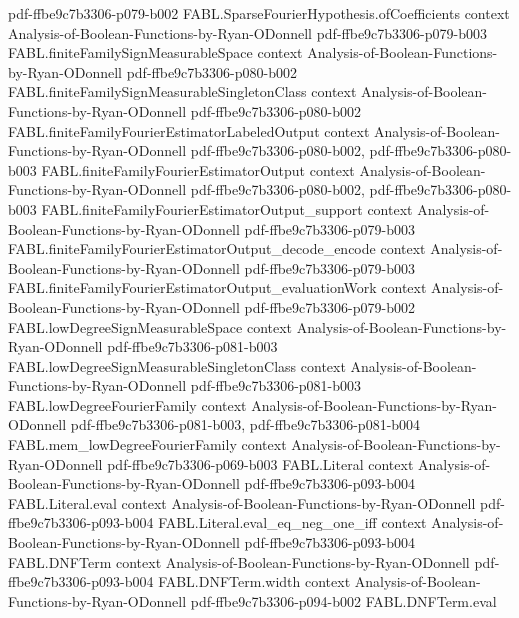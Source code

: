\begin{theorem}
  {pdf-ffbe9c7b3306-p079-b002}
\proofstep
  {FABL.SparseFourierHypothesis.ofCoefficients}
  {context}
  {Analysis-of-Boolean-Functions-by-Ryan-ODonnell}
  {pdf-ffbe9c7b3306-p079-b003}
\proofstep
  {FABL.finiteFamilySignMeasurableSpace}
  {context}
  {Analysis-of-Boolean-Functions-by-Ryan-ODonnell}
  {pdf-ffbe9c7b3306-p080-b002}
\proofstep
  {FABL.finiteFamilySignMeasurableSingletonClass}
  {context}
  {Analysis-of-Boolean-Functions-by-Ryan-ODonnell}
  {pdf-ffbe9c7b3306-p080-b002}
\proofstep
  {FABL.finiteFamilyFourierEstimatorLabeledOutput}
  {context}
  {Analysis-of-Boolean-Functions-by-Ryan-ODonnell}
  {pdf-ffbe9c7b3306-p080-b002,
    pdf-ffbe9c7b3306-p080-b003}
\proofstep
  {FABL.finiteFamilyFourierEstimatorOutput}
  {context}
  {Analysis-of-Boolean-Functions-by-Ryan-ODonnell}
  {pdf-ffbe9c7b3306-p080-b002,
    pdf-ffbe9c7b3306-p080-b003}
\proofstep
  {FABL.finiteFamilyFourierEstimatorOutput_support}
  {context}
  {Analysis-of-Boolean-Functions-by-Ryan-ODonnell}
  {pdf-ffbe9c7b3306-p079-b003}
\proofstep
  {FABL.finiteFamilyFourierEstimatorOutput_decode_encode}
  {context}
  {Analysis-of-Boolean-Functions-by-Ryan-ODonnell}
  {pdf-ffbe9c7b3306-p079-b003}
\proofstep
  {FABL.finiteFamilyFourierEstimatorOutput_evaluationWork}
  {context}
  {Analysis-of-Boolean-Functions-by-Ryan-ODonnell}
  {pdf-ffbe9c7b3306-p079-b002}
\proofstep
  {FABL.lowDegreeSignMeasurableSpace}
  {context}
  {Analysis-of-Boolean-Functions-by-Ryan-ODonnell}
  {pdf-ffbe9c7b3306-p081-b003}
\proofstep
  {FABL.lowDegreeSignMeasurableSingletonClass}
  {context}
  {Analysis-of-Boolean-Functions-by-Ryan-ODonnell}
  {pdf-ffbe9c7b3306-p081-b003}
\proofstep
  {FABL.lowDegreeFourierFamily}
  {context}
  {Analysis-of-Boolean-Functions-by-Ryan-ODonnell}
  {pdf-ffbe9c7b3306-p081-b003,
    pdf-ffbe9c7b3306-p081-b004}
\proofstep
  {FABL.mem_lowDegreeFourierFamily}
  {context}
  {Analysis-of-Boolean-Functions-by-Ryan-ODonnell}
  {pdf-ffbe9c7b3306-p069-b003}
\proofstep
  {FABL.Literal}
  {context}
  {Analysis-of-Boolean-Functions-by-Ryan-ODonnell}
  {pdf-ffbe9c7b3306-p093-b004}
\proofstep
  {FABL.Literal.eval}
  {context}
  {Analysis-of-Boolean-Functions-by-Ryan-ODonnell}
  {pdf-ffbe9c7b3306-p093-b004}
\proofstep
  {FABL.Literal.eval_eq_neg_one_iff}
  {context}
  {Analysis-of-Boolean-Functions-by-Ryan-ODonnell}
  {pdf-ffbe9c7b3306-p093-b004}
\proofstep
  {FABL.DNFTerm}
  {context}
  {Analysis-of-Boolean-Functions-by-Ryan-ODonnell}
  {pdf-ffbe9c7b3306-p093-b004}
\proofstep
  {FABL.DNFTerm.width}
  {context}
  {Analysis-of-Boolean-Functions-by-Ryan-ODonnell}
  {pdf-ffbe9c7b3306-p094-b002}
\proofstep
  {FABL.DNFTerm.eval}

\end{theorem}
